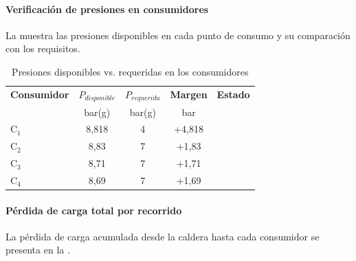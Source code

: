\paragraph{Verificación de presiones en consumidores}

La  muestra las presiones disponibles en cada punto de consumo y su comparación con los requisitos.

\begin{table}[H]
	\centering
	\caption{Presiones disponibles vs. requeridas en los consumidores}
	\label{tab:presiones-consumidores}
	\begin{tabular}{lcccc}
		\toprule
		\textbf{Consumidor} & \textbf{$P_{disponible}$} & \textbf{$P_{requerida}$} & \textbf{Margen} & \textbf{Estado} \\
		                    & bar(g)                    & bar(g)                   & bar             &                 \\
		\midrule
		C$_1$               & 8{,}818                   & 4                        & +4{,}818        & \checkmark      \\
		C$_2$               & 8{,}83                    & 7                        & +1{,}83         & \checkmark      \\
		C$_3$               & 8{,}71                    & 7                        & +1{,}71         & \checkmark      \\
		C$_4$               & 8{,}69                    & 7                        & +1{,}69         & \checkmark      \\
		\bottomrule
	\end{tabular}
\end{table}

\paragraph{Pérdida de carga total por recorrido}

La pérdida de carga acumulada desde la caldera hasta cada consumidor se presenta en la .

